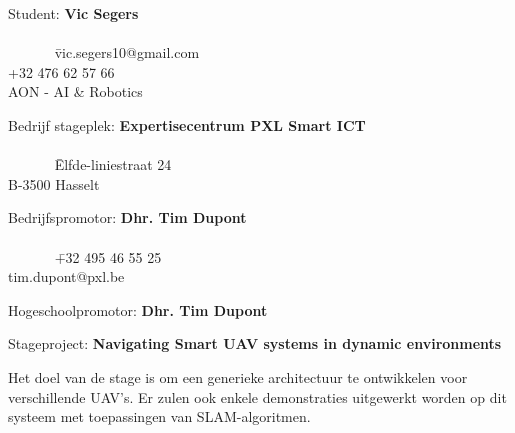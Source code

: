 \begin{tabbing}
  Student: \textbf{Vic Segers}\\
  \\
  ~~~~~~ \= vic.segers10@gmail.com\\
  \> +32 476 62 57 66\\
  \> AON - AI \& Robotics
\end{tabbing}
\begin{tabbing}
  Bedrijf stageplek: \textbf{Expertisecentrum PXL Smart ICT}\\
  \\
  ~~~~~~ \= Elfde-liniestraat 24\\
  \> B-3500 Hasselt
\end{tabbing}
\begin{tabbing}
  Bedrijfspromotor: \textbf{Dhr. Tim Dupont}\\
  \\
  ~~~~~~ \= +32 495 46 55 25\\
  \> tim.dupont@pxl.be
\end{tabbing}
\begin{tabbing}
  Hogeschoolpromotor: \textbf{Dhr. Tim Dupont}
\end{tabbing}
Stageproject: \textbf{Navigating Smart UAV systems in dynamic environments}
\begin{addmargin}[5ex]{0pt}
  Het doel van de stage is om een generieke architectuur te ontwikkelen voor verschillende UAV's.
  Er zulen ook enkele demonstraties uitgewerkt worden op dit systeem met toepassingen van SLAM-algoritmen.
\end{addmargin}